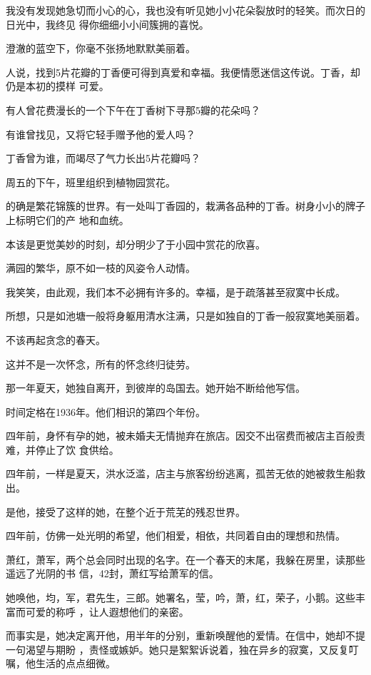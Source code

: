 \documentclass[12pt,a4paper]{article}
\begin{document}
		我没有发现她急切而小心的心，我也没有听见她小小花朵裂放时的轻笑。而次日的日光中，我终见
	得你细细小小间簇拥的喜悦。

		澄澈的蓝空下，你毫不张扬地默默美丽着。

		人说，找到5片花瓣的丁香便可得到真爱和幸福。我便情愿迷信这传说。丁香，却仍是本初的摸样
	可爱。

		有人曾花费漫长的一个下午在丁香树下寻那5瓣的花朵吗？\par
		有谁曾找见，又将它轻手赠予他的爱人吗？\par
		丁香曾为谁，而竭尽了气力长出5片花瓣吗？

		周五的下午，班里组织到植物园赏花。

		的确是繁花锦簇的世界。有一处叫丁香园的，栽满各品种的丁香。树身小小的牌子上标明它们的产
	地和血统。

		本该是更觉美妙的时刻，却分明少了于小园中赏花的欣喜。

		满园的繁华，原不如一枝的风姿令人动情。\par
		我笑笑，由此观，我们本不必拥有许多的。幸福，是于疏落甚至寂寞中长成。

		所想，只是如池塘一般将身躯用清水注满，只是如独自的丁香一般寂寞地美丽着。\par
		不该再起贪念的春天。


		这并不是一次怀念，所有的怀念终归徒劳。

	\endwriting



		那一年夏天，她独自离开，到彼岸的岛国去。她开始不断给他写信。

		时间定格在1936年。他们相识的第四个年份。

		四年前，身怀有孕的她，被未婚夫无情抛弃在旅店。因交不出宿费而被店主百般责难，并停止了饮
	食供给。

		四年前，一样是夏天，洪水泛滥，店主与旅客纷纷逃离，孤苦无依的她被救生船救出。

		是他，接受了这样的她，在整个近于荒芜的残忍世界。

		四年前，仿佛一处光明的希望，他们相爱，相依，共同着自由的理想和热情。

		萧红，萧军，两个总会同时出现的名字。在一个春天的末尾，我躲在房里，读那些遥远了光阴的书
	信，42封，萧红写给萧军的信。

		她唤他，均，军，君先生，三郎。她署名，莹，吟，萧，红，荣子，小鹅。这些丰富而可爱的称呼
	，让人遐想他们的亲密。

		而事实是，她决定离开他，用半年的分别，重新唤醒他的爱情。在信中，她却不提一句渴望与期盼
	，责怪或嫉妒。她只是絮絮诉说着，独在异乡的寂寞，又反复叮嘱，他生活的点点细微。
\end{document}
